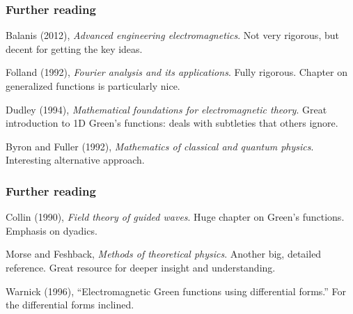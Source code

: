\documentclass[12 pt, compress, handout, intlimits]{beamer}
\begin{document}
\note{}

\begin{frame}[fragile]
    \frametitle{Further reading}
    Balanis (2012), \emph{Advanced engineering electromagnetics}. 
    Not very rigorous, but decent for getting the key ideas.

    Folland (1992), \emph{Fourier analysis and its applications}. 
    Fully rigorous. 
    Chapter on generalized functions is particularly nice.

    Dudley (1994), \emph{Mathematical foundations for electromagnetic theory}.
    Great introduction to 1D Green's functions: deals with subtleties that others ignore.

    Byron and Fuller (1992), \emph{Mathematics of classical and quantum physics}.
    Interesting alternative approach.
    
\end{frame}

\note{}

\begin{frame}[fragile]
    \frametitle{Further reading}
    Collin (1990), \emph{Field theory of guided waves}. 
    Huge chapter on Green's functions. 
    Emphasis on dyadics.

    Morse and Feshback, \emph{Methods of theoretical physics}.
    Another big, detailed reference. 
    Great resource for deeper insight and understanding.

    Warnick (1996), ``Electromagnetic Green functions using differential forms.''
    For the differential forms inclined.

\end{frame}    

\note{}
\end{document}

